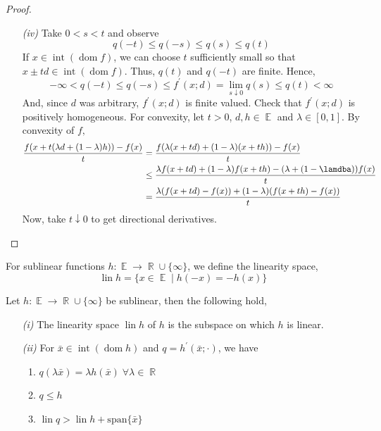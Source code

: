 \documentclass{tufte-handout}
\DeclareMathOperator{\dom}{dom}
\DeclareMathOperator{\R}{\mathbb{R}}
\DeclareMathOperator{\E}{\mathbb{E}}
\DeclareMathOperator{\inte}{int}
\DeclareMathOperator{\lin}{lin}
\begin{document}
{{\begin{proposition}
\begin{proof}
\begin{enumerate}
      \item[\it (iv)] Take $0 < s< t$ and observe 
      $$q(-t) \leq q(-s) \leq q(s) \leq q(t) $$
      If $x \in \inte (\dom f)$, we can choose $t$ sufficiently small so that $x \pm td \in \inte (\dom f)$. Thus, $q(t)$ and $q(-t)$ are finite. Hence, $$-\infty < q(-t) \leq q(-s) \leq f^\prime (x; d) = \lim_{s\downarrow 0} q(s ) \leq q(t)< \infty $$
      And, since $d$ was arbitrary, $f^\prime (x; d)$ is finite valued. Check that $f^\prime (x;d)$ is positively homogeneous. For convexity, let $t> 0$, $d,h\in \E$ and $\lambda \in [0,1]$. By convexity of $f,$
      \begin{equation*}
        \begin{split}
          \frac{f(x + t(\lambda d + (1- \lambda ) h)) -f(x)}{t} &=  \frac{f(\lambda(x + td) +  (1- \lambda ) (x + th)) -f(x)}{t}\\ 
          &\leq \frac{\lambda f(x + td) + (1- \lambda)f(x+ th) - (\lambda + (1- \lamdba))f(x)}{t} \\ 
          &= \frac{\lambda(f(x+ td) - f(x)) + (1-\lambda )(f(x+ th) -f(x))}{t} 
        \end{split}
      \end{equation*}
      Now, take $t \downarrow 0 $ to get directional derivatives.  
    \end{enumerate}
  \end{proof}
\end{proposition}
\begin{definition}
  For sublinear functions $h : \E \to \R \cup \{\infty \}$, we define the linearity space, 
  $$\lin h = \{x \in \E \mid h(-x) = - h(x)\} $$
\end{definition}
\begin{lemma} \label{lemsublin}
  Let $h: \E \to \R \cup \{\infty\}$ be sublinear, then the following hold, 
  \begin{enumerate}
    \item[\it (i)] The linearity space $\lin h$ of $h$ is the subspace on which $h$ is linear. 
    \item[\it (ii)] For $\bar x \in \inte (\dom h )$ and $q = h^\prime (\bar x ; \cdot ) $, we have 
    \begin{enumerate}
      \item $q(\lambda \bar x) = \lambda h(\bar x) \; \forall \lambda \in \R$
      \item $q\leq h $ 
      \item $\lin q > \lin h + \text{span}\{\bar x\}$
    \end{enumerate}


\end{enumerate}
\end{lemma}}}
\end{document}
